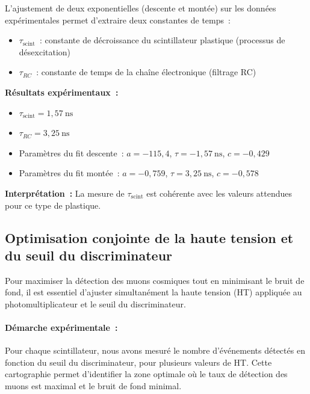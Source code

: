 \documentclass[a4paper,12pt,twoside]{article}
\begin{document}
L’ajustement de deux exponentielles (descente et montée) sur les données expérimentales permet d’extraire deux constantes de temps :
\begin{itemize}
    \item $\tau_{\text{scint}}$ : constante de décroissance du scintillateur plastique (processus de désexcitation)
    \item $\tau_{RC}$ : constante de temps de la chaîne électronique (filtrage RC)
\end{itemize}

\textbf{Résultats expérimentaux :}
\begin{itemize}
    \item $\tau_{\text{scint}} = 1{,}57~\text{ns}$
    \item $\tau_{RC} = 3{,}25~\text{ns}$
    \item Paramètres du fit descente : $a = -115{,}4$, $\tau = -1{,}57~\text{ns}$, $c = -0{,}429$
    \item Paramètres du fit montée : $a = -0{,}759$, $\tau = 3{,}25~\text{ns}$, $c = -0{,}578$
\end{itemize}

\textbf{Interprétation :} La mesure de $\tau_{\text{scint}}$ est cohérente avec les valeurs attendues pour ce type de plastique.

\subsection{Optimisation conjointe de la haute tension et du seuil du discriminateur}


\vspace{1em}
\begin{center}
\begin{tcolorbox}[colback=blue!5!white, colframe=blue!60!black, title=Optimisation conjointe des réglages électroniques]
Pour maximiser la détection des muons cosmiques tout en minimisant le bruit de fond, il est essentiel d’ajuster simultanément la haute tension (HT) appliquée au photomultiplicateur et le seuil du discriminateur.
\end{tcolorbox}
\end{center}


\paragraph{Démarche expérimentale~:}
Pour chaque scintillateur, nous avons mesuré le nombre d’événements détectés en fonction du seuil du discriminateur, pour plusieurs valeurs de HT. Cette cartographie permet d’identifier la zone optimale où le taux de détection des muons est maximal et le bruit de fond minimal.
\end{document}

